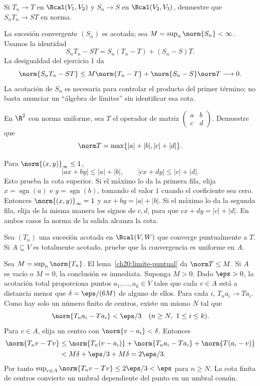 \begin{ejercicio}
Si $T_n\to T$ en $\Bcal(V_1,V_2)$ y $S_n\to S$ en $\Bcal(V_2,V_3)$, demuestre que $S_nT_n\to ST$ en norma.
\end{ejercicio}
\begin{solucion}
La sucesión convergente $(S_n)$ es acotada; sea $M=\sup_n\norm{S_n}<\infty$. Usamos la identidad
\[
 S_nT_n-ST=S_n(T_n-T)+(S_n-S)T.
\]
La desigualdad del ejercicio 1 da
\[
 \norm{S_nT_n-ST}\leq M\norm{T_n-T}+\norm{S_n-S}\norm T\longrightarrow0.
\]
La acotación de $S_n$ es necesaria para controlar el producto del primer término; no basta anunciar un ``álgebra de límites'' sin identificar esa cota.
\end{solucion}

\begin{ejercicio}
En $\R^2$ con norma uniforme, sea $T$ el operador de matriz $\begin{pmatrix}a&b\\c&d\end{pmatrix}$. Demuestre que
\[\norm T=\max\{|a|+|b|,|c|+|d|\}.\]
\end{ejercicio}
\begin{solucion}
Para $\norm{(x,y)}_\infty\leq1$,
\[
 |ax+by|\leq|a|+|b|,\qquad |cx+dy|\leq|c|+|d|.
\]
Esto prueba la cota superior. Si el máximo lo da la primera fila, elija $x=\operatorname{sgn}(a)$ e $y=\operatorname{sgn}(b)$, tomando el valor $1$ cuando el coeficiente sea cero. Entonces $\norm{(x,y)}_\infty=1$ y $ax+by=|a|+|b|$. Si el máximo lo da la segunda fila, elija de la misma manera los signos de $c,d$, para que $cx+dy=|c|+|d|$. En ambos casos la norma de la salida alcanza la cota.
\end{solucion}

\begin{ejercicio}
Sea $(T_n)$ una sucesión acotada en $\Bcal(V,W)$ que converge puntualmente a $T$. Si $A\subseteq V$ es totalmente acotado, pruebe que la convergencia es uniforme en $A$.
\end{ejercicio}
\begin{solucion}
Sea $M=\sup_n\norm{T_n}$. El lema~\ref{ch20:limite-puntual} da $\norm T\leq M$. Si $A$ es vacío o $M=0$, la conclusión es inmediata. Suponga $M>0$. Dado $\eps>0$, la acotación total proporciona puntos $a_1,\ldots,a_k\in V$ tales que cada $v\in A$ está a distancia menor que $\delta=\eps/(6M)$ de alguno de ellos. Para cada $i$, $T_na_i\to Ta_i$. Como hay solo un número finito de centros, existe un mismo $N$ tal que
\[
 \norm{T_na_i-Ta_i}<\eps/3\quad(n\geq N,\ 1\leq i\leq k).
\]
Para $v\in A$, elija un centro con $\norm{v-a_i}<\delta$. Entonces
\begin{align*}
 \norm{T_nv-Tv}
 &\leq\norm{T_n(v-a_i)}+\norm{T_na_i-Ta_i}+\norm{T(a_i-v)}\\
 &<M\delta+\eps/3+M\delta=2\eps/3.
\end{align*}
Por tanto $\sup_{v\in A}\norm{T_nv-Tv}\leq2\eps/3<\eps$ para $n\geq N$. La cota finita de centros convierte un umbral dependiente del punto en un umbral común.
\end{solucion}

